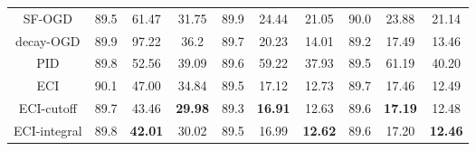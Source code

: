 \begin{table}[ht]
\begin{center}
\begin{tabular}{c|ccc|ccc|ccc}
SF-OGD      & 89.5 & 61.47 & 31.75  & 89.9 & 24.44 & 21.05  & 90.0 & 23.88 & 21.14  \\
decay-OGD    & 89.9 & 97.22          & 36.2           & 89.7 & 20.23          & 14.01          & 89.2 & 17.49          & 13.46          \\
PID          & 89.8 & 52.56          & 39.09          & 89.6 & 59.22          & 37.93          & 89.5 & 61.19          & 40.20          \\
ECI          & 90.1 & 47.00    & 34.84 & 89.5 & 17.12 & 12.73          & 89.7 & 17.46 & 12.49 \\
ECI-cutoff   & 89.7 & 43.46          & \textbf{29.98} & 89.3 & \textbf{16.91} & 12.63 & 89.6 & \textbf{17.19} & 12.48          \\
ECI-integral & 89.8 & \textbf{42.01} & 30.02          & 89.5 & 16.99          & \textbf{12.62} & 89.6 & 17.20          & \textbf{12.46} \\ \hline
\end{tabular}
\end{center}
\end{table}

